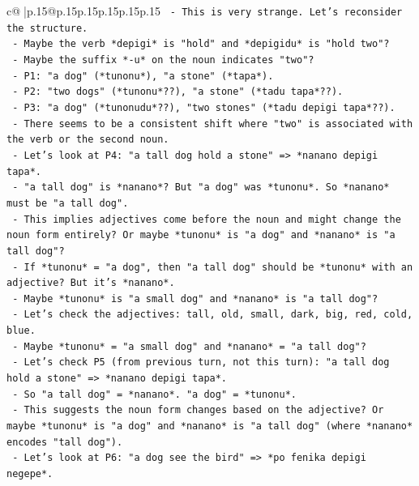 \documentclass{article}
\begin{document}
{\begin{supertabular}{c@{$\;$}|p{.15\linewidth}@{}p{.15\linewidth}p{.15\linewidth}p{.15\linewidth}p{.15\linewidth}p{.15\linewidth}}
{{{\texttt{            {-} This is very strange. Let's reconsider the structure.} \\
\texttt{            {-} Maybe the verb *depigi* is "hold" and *depigidu* is "hold two"?} \\
\texttt{            {-} Maybe the suffix *{-}u* on the noun indicates "two"?} \\
\texttt{            {-} P1: "a dog" (*tunonu*), "a stone" (*tapa*).} \\
\texttt{            {-} P2: "two dogs" (*tunonu*??), "a stone" (*tadu tapa*??).} \\
\texttt{            {-} P3: "a dog" (*tunonudu*??), "two stones" (*tadu depigi tapa*??).} \\
\texttt{            {-} There seems to be a consistent shift where "two" is associated with the verb or the second noun.} \\
\texttt{            {-} Let's look at P4: "a tall dog hold a stone" => *nanano depigi tapa*.} \\
\texttt{              {-} "a tall dog" is *nanano*? But "a dog" was *tunonu*. So *nanano* must be "a tall dog".} \\
\texttt{              {-} This implies adjectives come before the noun and might change the noun form entirely? Or maybe *tunonu* is "a dog" and *nanano* is "a tall dog"?} \\
\texttt{              {-} If *tunonu* = "a dog", then "a tall dog" should be *tunonu* with an adjective? But it's *nanano*.} \\
\texttt{              {-} Maybe *tunonu* is "a small dog" and *nanano* is "a tall dog"?} \\
\texttt{              {-} Let's check the adjectives: tall, old, small, dark, big, red, cold, blue.} \\
\texttt{              {-} Maybe *tunonu* = "a small dog" and *nanano* = "a tall dog"?} \\
\texttt{              {-} Let's check P5 (from previous turn, not this turn): "a tall dog hold a stone" => *nanano depigi tapa*.} \\
\texttt{              {-} So "a tall dog" = *nanano*. "a dog" = *tunonu*.} \\
\texttt{              {-} This suggests the noun form changes based on the adjective? Or maybe *tunonu* is "a dog" and *nanano* is "a tall dog" (where *nanano* encodes "tall dog").} \\
\texttt{              {-} Let's look at P6: "a dog see the bird" => *po fenika depigi negepe*.} \\
}}}
\end{supertabular}}
\end{document}

